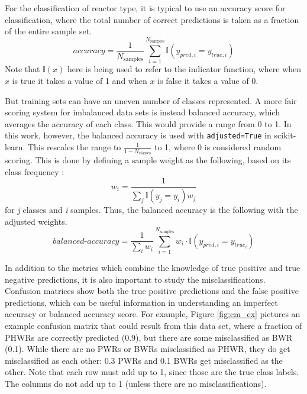 For the classification of reactor type, it is typical to use an accuracy score
for classification, where the total number of correct predictions is taken as a
fraction of the entire sample set.
\begin{equation}
  \textit{accuracy} = \frac{1}{N_\text{samples}} \sum_{i=1}^{N_\text{samples}} 
                      \mathbb{I}(y_{pred,i} = y_{true,i})
\end{equation}
Note that $\mathbb{I}(x)$ here is being used to refer to the indicator
function, where when $x$ is true it takes a value of 1 and when $x$ is false it
takes a value of 0.

But training sets can have an uneven number of classes represented.  A more
fair scoring system for imbalanced data sets is instead balanced accuracy, which
averages the accuracy of each class. This would provide a range from 0 to 1. In
this work, however, the balanced accuracy is used with \texttt{adjusted=True}
in scikit-learn. This rescales the range to $\frac{1}{1-N_\text{classes}}$ to
1, where 0 is considered random scoring.  This is done by defining a sample
weight as the following, based on its class frequency \cite{scikit}:
\begin{equation}
  w_i = \frac{1}{\sum_j{\mathbb{I}(y_j = y_i) w_j}}
\end{equation}
for \textit{j} classes and \textit{i} samples. Thus, the balanced accuracy is 
the following with the adjusted weights.
\begin{equation}
  \textit{balanced-accuracy} = \frac{1}{\sum_{i}{w_i}} \sum_{i=1}^{N_\text{samples}}
                               w_i \cdot \mathbb{I}(y_{pred, i} = y_{true_i})
\end{equation}

In addition to the metrics which combine the knowledge of true positive and
true negative predictions, it is also important to study the
misclassifications. Confusion matrices show both the true positive predictions
and the false positive predictions, which can be useful information in
understanding an imperfect accuracy or balanced accuracy score. For example,
Figure \ref{fig:cm_ex} pictures an example confusion matrix that could result
from this data set, where a fraction of \gls{PHWR}s are correctly predicted
(0.9), but there are some misclassified as \gls{BWR} (0.1).  While there are no
\gls{PWR}s or \gls{BWR}s misclassified as \gls{PHWR}, they do get misclassified
as each other: 0.3 \gls{PWR}s and 0.1 \gls{BWR}s get misclassified as the
other.  Note that each row must add up to 1, since those are the true class
labels. The columns do not add up to 1 (unless there are no
misclassifications).  

